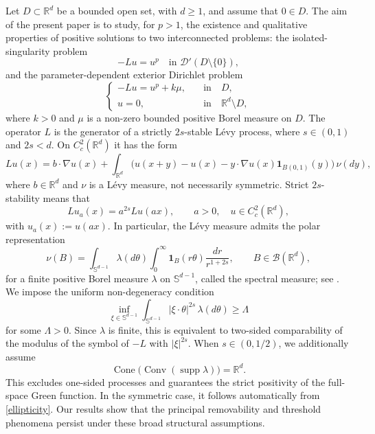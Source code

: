\documentclass[11pt,a4paper,reqno]{amsart}
\theoremstyle{definition}
\numberwithin{equation}{section}
\begin{document}
Let $D\subset\mathbb R^d$ be a bounded open set, with $d\ge 1$, and assume that $0\in D$. 
The aim of the present paper is to study, for $p>1$, the existence and qualitative properties of positive solutions to two interconnected problems:
the isolated-singularity problem
\begin{equation}
\label{eq1.0}
-Lu=u^p\quad\text{in }\mathscr D'(D\setminus\{0\}),
\end{equation}
and the parameter-dependent exterior Dirichlet problem
\begin{equation}
\label{eq1.1}
\begin{cases}
-Lu=u^p+k\mu,\quad &\text{in}\quad D, \\
u=0,\quad &\text{in}\quad\mathbb{R}^d\setminus D,
\end{cases}
\end{equation}
where $k>0$ and $\mu$ is a non-zero bounded  positive Borel measure on $D$.
The operator $L$ is the generator of a strictly $2s$-stable L\'evy process, where $s\in(0,1)$ and $2s<d$.
On $C_c^2(\mathbb R^d)$ it has the form
\begin{equation}
\label{L}
Lu(x)=b\cdot\nabla u(x)+\int_{\mathbb R^d}\bigl(u(x+y)-u(x)-y\cdot\nabla u(x)\mathbf 1_{B(0,1)}(y)\bigr)\,\nu(dy),
\end{equation}
where $b\in\mathbb R^d$ and $\nu$ is a L\'evy measure, not necessarily symmetric. Strict $2s$-stability means that
\begin{equation}
\label{scaling_def}
Lu_a(x)=a^{2s}Lu(ax),
\qquad a>0,\quad u\in C_c^2(\mathbb R^d),
\end{equation}
with $u_a(x):=u(ax)$. In particular, the L\'evy measure admits the polar representation
\begin{equation}
\label{eq.specme}
\nu(B)=\int_{\mathbb S^{d-1}}\lambda(d\theta)\int_0^\infty \mathbf 1_B(r\theta)\frac{dr}{r^{1+2s}},
\qquad B\in\mathcal B(\mathbb R^d),
\end{equation}
for a finite positive Borel measure $\lambda$ on $\mathbb S^{d-1}$, called the spectral measure; 
see \cite[Theorem~14.3]{Sato}. We impose the uniform non-degeneracy condition
\begin{equation}
\label{ellipticity}
\inf_{\xi\in\mathbb S^{d-1}}
\int_{\mathbb S^{d-1}}|\xi\cdot\theta|^{2s}\,\lambda(d\theta)\ge \Lambda
\end{equation}
for some $\Lambda>0$. Since $\lambda$ is finite, this is equivalent to two-sided comparability of the modulus 
of the symbol of $-L$ with $|\xi|^{2s}$. When $s\in(0,1/2)$, we additionally assume
\[
\operatorname{Cone}\bigl(\operatorname{Conv}(\operatorname{supp}\lambda)\bigr)=\mathbb R^d.
\]
This excludes one-sided processes and guarantees the strict positivity of the full-space Green function. 
In the symmetric case, it follows automatically from \eqref{ellipticity}.
Our results show that the principal removability and threshold phenomena persist under these broad structural assumptions.
\end{document}
